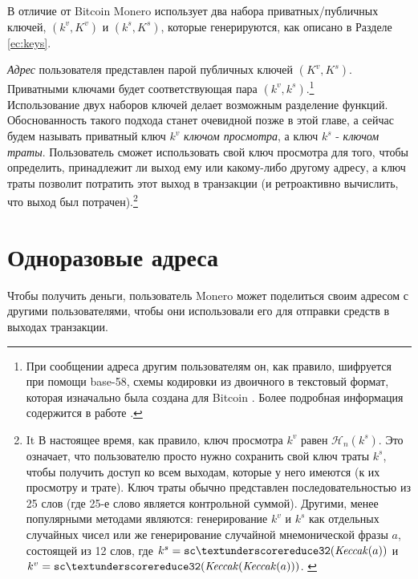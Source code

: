 В отличие от Bitcoin Monero использует два набора приватных/публичных ключей, \((k^v, K^v)\) и \( (k^s, K^s) \), которые генерируются, как описано в Разделе \ref{ec:keys}.

{\em Адрес} пользователя представлен парой публичных ключей \((K^v, K^s)\). Приватными ключами будет соответствующая пара \( (k^v, k^s) \).\footnote{При сообщении адреса другим пользователям он, как правило, шифруется при помощи base-58, схемы кодировки из двоичного в текстовый формат, которая изначально была создана для Bitcoin \cite{base-58-encoding}. Более подробная информация содержится в работе \cite{luigi-address}.}
\\

Использование двух наборов ключей делает возможным разделение функций. Обоснован\-ность такого подхода станет очевидной позже в этой главе, а сейчас будем называть приват\-ный ключ $k^v$ {\em ключом просмотра}, а ключ $k^s$ - {\em ключом траты}. Пользователь сможет использо\-вать свой ключ просмотра для того, чтобы определить, принадлежит ли выход ему или какому-либо другому адресу, а ключ траты позволит потратить этот выход в транзакции (и ретроактивно вычислить, что выход был потрачен).\footnote{It В настоящее время, как правило, ключ просмотра $k^v$ равен $\mathcal{H}_n(k^s)$. Это означает, что пользователю просто нужно сохранить свой ключ траты $k^s$, чтобы получить доступ ко всем выходам, которые у него имеются (к их просмотру и трате). Ключ траты обычно представлен последовательностью из 25 слов (где 25-е слово является контрольной суммой). Другими, менее популярными методами являются: генерирование $k^v$ и $k^s$ как отдельных случайных чисел или же генерирование случайной мнемонической фразы $a$, состоящей из 12 слов, где $k^s = {\tt sc\textunderscore reduce32}(\mathit{Keccak}(a))$ и $k^v = {\tt sc\textunderscore reduce32}(\mathit{Keccak}(\mathit{Keccak}(a)))$. \cite{luigi-address}}



\section{Одноразовые адреса}
\label{sec:one-time-addresses}

Чтобы получить деньги, пользователь Monero может поделиться своим адресом с другими пользователями, чтобы они использовали его для отправки средств в выходах транзакции.

